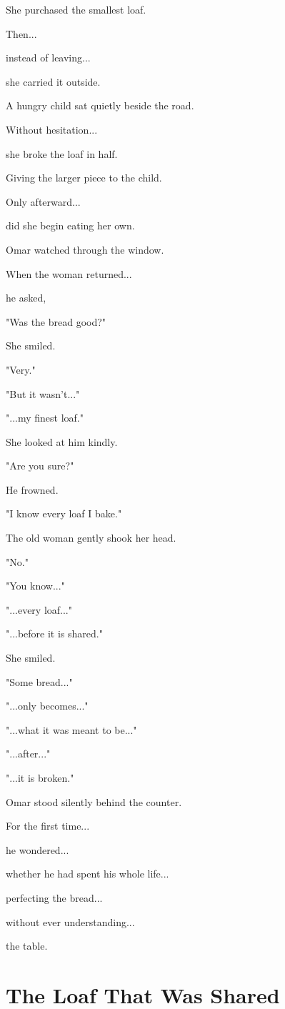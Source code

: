 \documentclass[12pt,openany]{book}
\begin{document}
She purchased the smallest loaf.

Then...

instead of leaving...

she carried it outside.

A hungry child sat quietly beside the road.

Without hesitation...

she broke the loaf in half.

Giving the larger piece to the child.

Only afterward...

did she begin eating her own.

Omar watched through the window.

When the woman returned...

he asked,

"Was the bread good?"

She smiled.

"Very."

"But it wasn't..."

"...my finest loaf."

She looked at him kindly.

"Are you sure?"

He frowned.

"I know every loaf I bake."

The old woman gently shook her head.

"No."

"You know..."

"...every loaf..."

"...before it is shared."

She smiled.

"Some bread..."

"...only becomes..."

"...what it was meant to be..."

"...after..."

"...it is broken."

Omar stood silently behind the counter.

For the first time...

he wondered...

whether he had spent his whole life...

perfecting the bread...

without ever understanding...

the table.
\section*{The Loaf That Was Shared}
\end{document}
